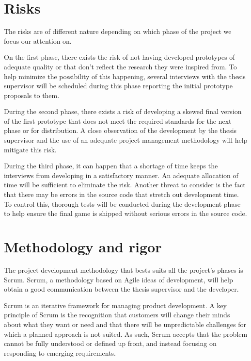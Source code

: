 \section{Risks}

The risks are of different nature depending on which phase of the project we focus our attention on.

On the first phase, there exists the risk of not having developed prototypes of adequate quality or that don't reflect the research they were inspired from. To help minimize the possibility of this happening, several interviews with the thesis supervisor will be scheduled during this phase reporting the initial prototype proposals to them.

During the second phase, there exists a risk of developing a skewed final version of the first prototype that does not meet the required standards for the next phase or for distribution. A close observation of the development by the thesis supervisor and the use of an adequate project management methodology will help mitigate this risk.

During the third phase, it can happen that a shortage of time keeps the interviews from developing in a satisfactory manner. An adequate allocation of time will be sufficient to eliminate the risk. Another threat to consider is the fact that there may be errors in the source code that stretch out development time. To control this, thorough tests will be conducted during the development phase to help ensure the final game is shipped without serious errors in the source code. 

\section{Methodology and rigor}

The project development methodology that bests suits all the project's phases is Scrum. Scrum, a methodology based on Agile ideas of development, will help obtain a good communication between the thesis supervisor and the developer.

Scrum is an iterative framework for managing product development. A key principle of Scrum is the recognition that customers will change their minds about what they want or need and that there will be unpredictable challenges for which a planned approach is not suited. As such, Scrum accepts that the problem cannot be fully understood or defined up front, and instead focusing on responding to emerging requirements.

